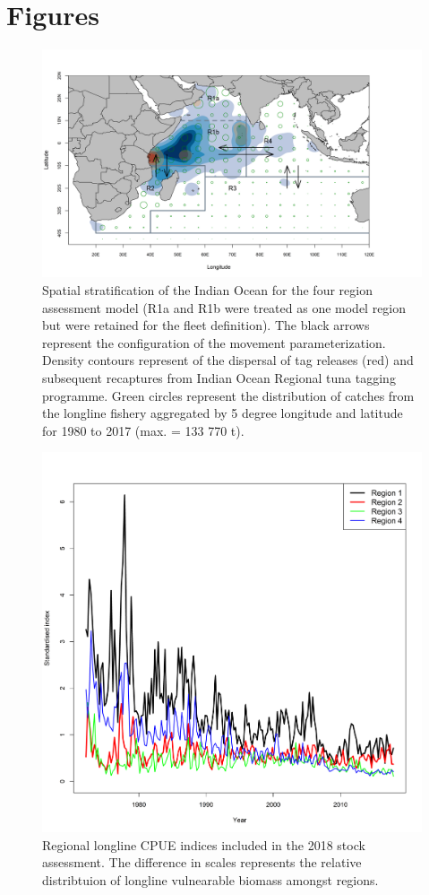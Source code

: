 \documentclass[12pt,halfline,a4paper,nonumbib]{ouparticle}
\begin{document}
\section{Figures}

\begin{figure}[!ht]
\centering
\includegraphics[width=6in]{map.png}
\caption{Spatial stratification of the Indian Ocean for the four region assessment model (R1a and R1b were treated as one model region but were retained for the fleet definition). The black arrows represent the configuration of the movement parameterization.  Density contours represent of the dispersal of tag releases (red) and subsequent recaptures from Indian Ocean Regional tuna tagging programme. Green circles represent the distribution of catches from the longline fishery aggregated by 5 degree longitude and latitude for 1980 to 2017 (max. = 133 770 t).}
\label{fig:map}
\end{figure}


\begin{figure}[!ht]
\centering
\includegraphics[width=6in]{ll.png}
\caption{Regional longline CPUE indices included in the 2018 stock assessment. The difference in scales represents the relative distribtuion of longline vulnearable biomass amongst regions.}
\label{fig:ll}
\end{figure}
\end{document}
